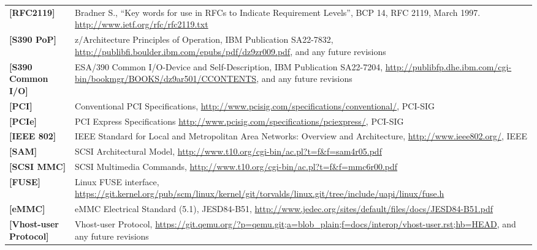 \begin{longtable}{l p{5in}}
	\label{intro:rfc2119}\textbf{[RFC2119]} &
Bradner S., ``Key words for use in RFCs to Indicate Requirement
Levels'', BCP 14, RFC 2119, March 1997. \newline\url{http://www.ietf.org/rfc/rfc2119.txt}\\
	\label{intro:S390 PoP}\textbf{[S390 PoP]} & z/Architecture Principles of Operation, IBM Publication SA22-7832, \newline\url{http://publibfi.boulder.ibm.com/epubs/pdf/dz9zr009.pdf}, and any future revisions\\
	\label{intro:S390 Common I/O}\textbf{[S390 Common I/O]} & ESA/390 Common I/O-Device and Self-Description, IBM Publication SA22-7204, \newline\url{http://publibfp.dhe.ibm.com/cgi-bin/bookmgr/BOOKS/dz9ar501/CCONTENTS}, and any future revisions\\
	\label{intro:PCI}\textbf{[PCI]} &
	Conventional PCI Specifications,
	\newline\url{http://www.pcisig.com/specifications/conventional/},
	PCI-SIG\\
	\label{intro:PCIe}\textbf{[PCIe]} &
	PCI Express Specifications
	\newline\url{http://www.pcisig.com/specifications/pciexpress/},
	PCI-SIG\\
	\label{intro:IEEE 802}\textbf{[IEEE 802]} &
	IEEE Standard for Local and Metropolitan Area Networks: Overview and Architecture,
	\newline\url{http://www.ieee802.org/},
	IEEE\\
	\label{intro:SAM}\textbf{[SAM]} &
        SCSI Architectural Model,
        \newline\url{http://www.t10.org/cgi-bin/ac.pl?t=f&f=sam4r05.pdf}\\
	\label{intro:SCSI MMC}\textbf{[SCSI MMC]} &
        SCSI Multimedia Commands,
        \newline\url{http://www.t10.org/cgi-bin/ac.pl?t=f&f=mmc6r00.pdf}\\
	\label{intro:FUSE}\textbf{[FUSE]} &
	Linux FUSE interface,
	\newline\url{https://git.kernel.org/pub/scm/linux/kernel/git/torvalds/linux.git/tree/include/uapi/linux/fuse.h}\\
        \label{intro:eMMC}\textbf{[eMMC]} &
        eMMC Electrical Standard (5.1), JESD84-B51,
        \newline\url{http://www.jedec.org/sites/default/files/docs/JESD84-B51.pdf}\\
	\label{intro:Vhost-user Protocol}\textbf{[Vhost-user Protocol]} & Vhost-user Protocol, \newline\url{https://git.qemu.org/?p=qemu.git;a=blob_plain;f=docs/interop/vhost-user.rst;hb=HEAD}, and any future revisions\\

\end{longtable}

